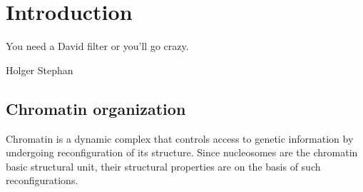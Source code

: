 \chapter{Introduction}
\label{ch:intro}

\epigraph{You need a David filter or you'll go crazy.}{Holger Stephan}








\section{Chromatin organization}
  Chromatin is a dynamic complex that controls access to genetic information by
  undergoing reconfiguration of its structure. Since nucleosomes are the chromatin
  basic structural unit, their structural properties are on the basis of such reconfigurations.

